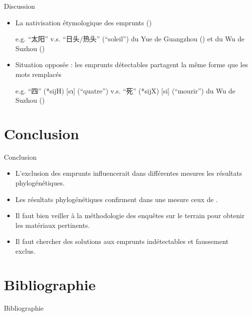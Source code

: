 \documentclass[11pt]{beamer}
\begin{document}
\begin{frame}{Discussion}
\begin{itemize}
\item{La nativisation étymologique des emprunts (\cite{aikio2007etymological})

e.g. ``太阳'' v.s. ``日头/热头'' (``soleil'') du Yue de Guangzhou (\cite[389]{Zhan2002yue}) et du Wu de Suzhou (\cite[346]{Ye1988suzhou_fangyanzhi})
}

\item{Situation opposée : les emprunts détectables partagent la même forme que les mots remplacés

e.g. ``四'' (*sijH) [sɿ] (``quatre'') v.s. ``死'' (*sijX) [si] (``mourir'') du Wu de Suzhou (\cite[96]{Liu2007hexinci})
}
\end{itemize}
\end{frame}

\section{Conclusion}
\begin{frame}{Conclusion}
\begin{itemize}
\item{L'exclusion des emprunts influencerait dans différentes mesures les résultats phylogénétiques.}

\item{Les résultats phylogénétiques confirment dans une mesure ceux de \textcite{sagart2011classifying}.}

\item{Il faut bien veiller à la méthodologie des enquêtes sur le terrain pour obtenir les matériaux pertinents.}

\item{Il faut chercher des solutions aux emprunts indétectables et faussement exclus.}
\end{itemize}
\end{frame}

\section*{Bibliographie}
\begin{frame}[allowframebreaks]{Bibliographie}
\printbibliography
\end{frame}
\end{document}
